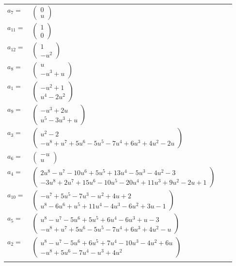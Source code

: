 \documentclass[1p]{elsarticle_modified}
\theoremstyle{definition}
\begin{document}
\begin{tabular}{m{7pt} m{180pt} m{7pt} m{180pt} }
\flushright $a_{7}=$&$\begin{pmatrix}0\\u\end{pmatrix}$ \\
\flushright $a_{11}=$&$\begin{pmatrix}1\\0\end{pmatrix}$ \\
\flushright $a_{12}=$&$\begin{pmatrix}1\\- u^2\end{pmatrix}$ \\
\flushright $a_{8}=$&$\begin{pmatrix}u\\- u^3+u\end{pmatrix}$ \\
\flushright $a_{1}=$&$\begin{pmatrix}- u^2+1\\u^4-2 u^2\end{pmatrix}$ \\
\flushright $a_{9}=$&$\begin{pmatrix}- u^3+2 u\\u^5-3 u^3+u\end{pmatrix}$ \\
\flushright $a_{3}=$&$\begin{pmatrix}u^2-2\\- u^8+u^7+5 u^6-5 u^5-7 u^4+6 u^3+4 u^2-2 u\end{pmatrix}$ \\
\flushright $a_{6}=$&$\begin{pmatrix}- u\\u\end{pmatrix}$ \\
\flushright $a_{4}=$&$\begin{pmatrix}2 u^8- u^7-10 u^6+5 u^5+13 u^4-5 u^3-4 u^2-3\\-3 u^8+2 u^7+15 u^6-10 u^5-20 u^4+11 u^3+9 u^2-2 u+1\end{pmatrix}$ \\
\flushright $a_{10}=$&$\begin{pmatrix}- u^7+5 u^5-7 u^3- u^2+4 u+2\\u^8-6 u^6+u^5+11 u^4-4 u^3-6 u^2+3 u-1\end{pmatrix}$ \\
\flushright $a_{5}=$&$\begin{pmatrix}u^8- u^7-5 u^6+5 u^5+6 u^4-6 u^3+u-3\\- u^8+u^7+5 u^6-5 u^5-7 u^4+6 u^3+4 u^2- u\end{pmatrix}$ \\
\flushright $a_{2}=$&$\begin{pmatrix}u^8- u^7-5 u^6+6 u^5+7 u^4-10 u^3-4 u^2+6 u\\- u^8+5 u^6-7 u^4- u^3+4 u^2\end{pmatrix}$\\&\end{tabular}
\end{document}
